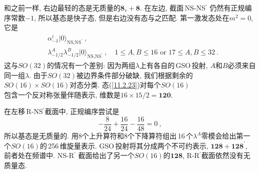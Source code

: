 和之前一样, 右边最轻的态是无质量的$ \mathbf{8}_{v}+\mathbf{8}$. 在左边, 截面\,NS-NS$^{\prime}$ 仍然有正规编序常数$ -1$, 所以基态是快子态, 但是右边没有态与之匹配. 第一激发态处在$ m^{2}=0 $, 它是
\begin{align}
    & \alpha_{-1}^{i}\lvert0\rangle_{\text{NS,NS}^{\prime}} \:, \nonumber \\
    & \lambda^{A}_{-1/2}\lambda^{B}_{-1/2} \lvert0\rangle_{\text{NS,NS}^{\prime}} \:, \quad
    1\leq A,B\leq 16 \text{ or } 17\leq A,B \leq 32 \:. \label{11.2.23}
\end{align}
这与$ SO(32) $的情况有一个差别: 因为两组$ \lambda $上有各自的\,GSO\,投射, $A $和$ B $必须来自同一组$ \lambda$. 由于$ SO(32) $被边界条件部分破缺, 我们根据剩余的$ SO(16)\times SO(16) $对态分类. 态(\ref{11.2.23})对每个$ SO(16) $\\包含一个反对称张量伴随表示, 维数是$ 16\times 15/2=\mathbf{120}$. 

在左移\,R-NS$^{\prime} $截面中, 正规编序尝试是
\begin{equation}
    -\frac{8}{24} + \frac{16}{24} - \frac{16}{48} =0 \:, \label{11.2.24}
\end{equation}
所以基态是无质量的. 用8个上升算符和8个下降算符组出\,16\,个$ \lambda^{A} $零模会给出第一个$ SO(16) $的\,256\,维旋量表示. GSO\,投射将其分成两个不可约表示, $\mathbf{128}+\mathbf{128}^{\prime}$, 前者处在频谱中. NS-R$^{\prime}$ 截面给出了另一个$ SO(16) $的$ \mathbf{128}$, R-R$^{\prime}$截面依然没有无质量态.

